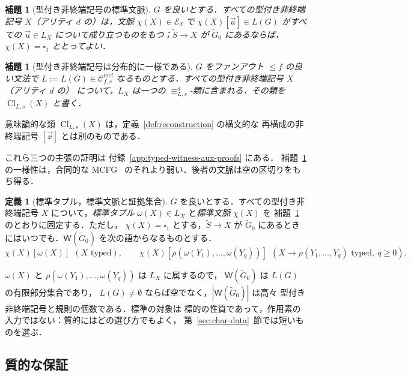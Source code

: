 \documentclass[11pt,a4paper]{ltjsarticle}
\numberwithin{equation}{section}
\theoremstyle{plain}
\newtheorem{lemma}[theorem]{補題}
\theoremstyle{definition}
\newtheorem{definition}[theorem]{定義}
\theoremstyle{remark}
\newcommand{\Wit}{\mathsf{W}}
\newcommand{\Cmcf}[2]{\mathcal{C}^{\mathrm{mcf}}_{#1,#2}}
\newcommand{\tuple}[1]{\vec{#1}}
\newcommand{\blank}{\square}
\theoremstyle{plain}
\begin{document}
\begin{lemma}[型付き非終端記号の標準文脈]
\label{lem:identity-canonical-contexts}
$G$ を良いとする．すべての型付き非終端記号 $X$（アリティ $d$ の）は，文脈
$\chi(X)\in\mathcal E_d$ で $\chi(X)[\tuple u]\in L(G)$ がすべての
$\tuple u\in L_X$ について成り立つものをもつ；$\widetilde S\to X$ が $\widetilde G_0$ にあるならば，
$\chi(X)=\blank_1$ ととってよい．
\end{lemma}

\begin{lemma}[型付き非終端記号は分布的に一様である]
\label{lem:typed-homogeneity}
$G$ をファンアウト $\le f$ の良い文法で $L:=L(G)\in\Cmcf{f}{s}$ なるものとする．すべての型付き非終端記号 $X$（アリティ $d$ の）
について，$L_X$ は一つの $\equiv_{L,s}^d$-類に含まれる．その類を
$\operatorname{Cl}_{L,s}(X)$ と書く．
\end{lemma}

意味論的な類 $\operatorname{Cl}_{L,s}(X)$ は，定義~\ref{def:reconstruction} の構文的な
再構成の非終端記号 $[\tuple x]$ とは別のものである．

これら三つの主張の証明は
付録~\ref{app:typed-witness-aux-proofs} にある．
補題~\ref{lem:typed-homogeneity} の一様性は，合同的な
MCFG~\cite{ClarkYoshinaka2016} のそれより弱い．後者の文脈は空の区切りをもち得る．

\begin{definition}[標準タプル，標準文脈と証拠集合]
\label{def:target-canonical}
\label{def:witness-set}
$G$ を良いとする．すべての型付き非終端記号 $X$ について，\emph{標準タプル}
$\omega(X)\in L_X$ と\emph{標準文脈} $\chi(X)$ を
補題~\ref{lem:identity-canonical-contexts} のとおりに固定する．ただし，
$\chi(X)=\blank_1$ とする，$\widetilde S\to X$ が $\widetilde G_0$ にあるときにはいつでも．$\Wit(\widetilde G_0)$
を次の語からなるものとする．
\[
 \chi(X)[\omega(X)]\ \ (X\text{ typed}),\qquad
 \chi(X)[\rho(\omega(Y_1),\ldots,\omega(Y_q))]\ \
 (X\to\rho(Y_1,\ldots,Y_q)\text{ typed},\ q\ge0).
\]
\end{definition}

$\omega(X)$ と $\rho(\omega(Y_1),\ldots,\omega(Y_q))$ は $L_X$ に属するので，
$\Wit(\widetilde G_0)$ は $L(G)$ の有限部分集合であり，
$L(G)\ne\emptyset$ ならば空でなく，$|\Wit(\widetilde G_0)|$ は高々
型付き非終端記号と規則の個数である．標準の対象は
標的の性質であって，作用素の入力ではない：質的にはどの選び方でもよく，
第~\ref{sec:char-data}~節では短いものを選ぶ．

\subsection{質的な保証}
\label{sec:completeness}
\label{sec:poly-time}
\end{document}
